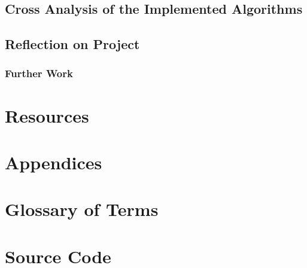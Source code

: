 \section{Cross Analysis of the Implemented Algorithms}


\section{Reflection on Project}
\subsection{Further Work}


\chapter{Resources}

\nocite{*}




\chapter{Appendices}

\appendix
\chapter{Glossary of Terms}\label{sec:glosterm}

\printglossaries

\newpage
\chapter{Source Code}\label{sec:srccode}


